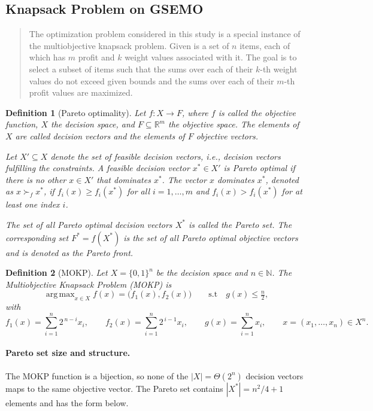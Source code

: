\documentclass[a4paper, 11pt]{report}
\DeclareMathOperator*{\argmax}{arg\,max}
\newtheorem{definition}{Definition}
\theoremstyle{remark}
\begin{document}
\subsection{Knapsack Problem on GSEMO \cite{laumanns2004running}}
\begin{quote}
The optimization problem considered in this study is a special instance of the multiobjective knapsack problem. Given is a set of $n$ items, each 
of which has $m$ profit and $k$ weight values associated with it. The goal is to select a subset of items such that the sums over each of their 
$k$-th weight values do not exceed given bounds and the sums over each of their $m$-th profit values are maximized.
\end{quote}
\begin{definition}[Pareto optimality]
Let $f : X \to F$, where $f$ is called the \textit{objective function}, $X$ the \textit{decision space}, and 
$F \subseteq \mathbb{R}^m$ the \textit{objective space}. The elements of $X$ are called \textit{decision vectors} 
and the elements of $F$ \textit{objective vectors}. 

Let $X' \subseteq X$ denote the set of feasible decision vectors, i.e., decision vectors fulfilling the constraints. 
A feasible decision vector $x^* \in X'$ is \textit{Pareto optimal} if there is no other $x \in X'$ that dominates 
$x^*$. The vector $x$ dominates $x^*$, denoted as $x \succ_f x^*$, if $f_i(x) \ge f_i(x^*)$ for all $i = 1, \ldots, m$ 
and $f_i(x) > f_i(x^*)$ for at least one index $i$.

The set of all Pareto optimal decision vectors $X^*$ is called the \textit{Pareto set}. 
The corresponding set $F^* = f(X^*)$ is the set of all Pareto optimal objective vectors and is 
denoted as the \textit{Pareto front}.
\end{definition}

\begin{definition}[MOKP]
Let $X=\{0,1\}^n$ be the decision space and $n\in\mathbb{N}$. The Multiobjective Knapsack Problem (MOKP) is
\begin{equation*}
    \argmax_{x\in X}f(x)=\bigl(f_1(x),f_2(x)\bigr)
    \qquad
    \mathrm{s.t}\quad g(x)\le \tfrac{n}{2},
\end{equation*}
with
\[
f_1(x)=\sum_{i=1}^{n}2^{\,n-i}x_i,\qquad
f_2(x)=\sum_{i=1}^{n}2^{\,i-1}x_i,\qquad
g(x)=\sum_{i=1}^{n}x_i,\qquad
x=(x_1,\ldots,x_n)\in X^n.
\]
\end{definition}

\paragraph{Pareto set size and structure.}
The MOKP function is a bijection, so none of the $|X|=\Theta(2^n)$ decision vectors maps to the same objective vector. 
The Pareto set contains $|X^*|=n^2/4+1$ elements and has the form below.
\end{document}
